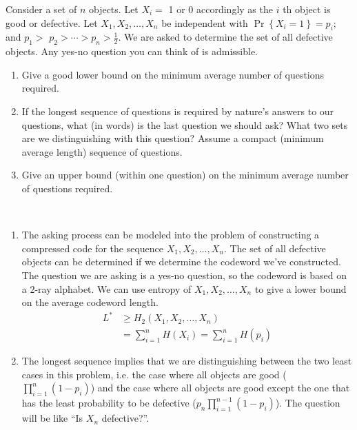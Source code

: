 \begin{exercise}{ Consider a set of $n$ objects. Let $X_{i}=$ 1 or 0 accordingly as the $i$ th object is good or defective. Let $X_{1}, X_{2}, \ldots, X_{n}$ be independent with $\operatorname{Pr}\left\{X_{i}=1\right\}=p_{i} ;$ and $p_{1}>$
  $p_{2}>\cdots>p_{n}>\frac{1}{2} .$ We are asked to determine the set of all defective objects. Any yes-no question you can think of is admissible.
  \begin{enumerate}
    \item Give a good lower bound on the minimum average number of questions required. 
    \item If the longest sequence of questions is required by nature's answers to our questions, what (in words) is the last question we should ask? What two sets are we distinguishing with this question? Assume a compact (minimum average length) sequence of questions.
    \item Give an upper bound (within one question) on the minimum average number of questions required.
  \end{enumerate}}
  \begin{solution}
  \par{~}
  \begin{enumerate}
    \item { 
      The asking process can be modeled into the problem of constructing a compressed code for the sequence $X_1,X_2,\ldots,X_n$. The set of all defective objects can be determined if we determine the codeword we've constructed. The question we are asking is a yes-no question, so the codeword is based on a 2-ray alphabet. We can use entropy of $X_1,X_2,\ldots,X_n$ to give a lower bound on the average codeword length.
      \begin{equation}
        \begin{aligned}
          L^* &\ge H_2 (X_1,X_2,\ldots,X_n) \\
          &= \sum_{i=1}^{n} H(X_i) = \sum_{i=1}^{n} H(p_i)
        \end{aligned}
      \end{equation} 
    }
    \item { The longest sequence implies that we are distinguishing between the two least cases in this problem, i.e. the case where all objects are good ($\prod_{i=1}^n(1-p_i)$) and the case where all objects are good except the one that has the least probability to be defective ($p_n \prod_{i=1}^{n-1}(1-p_i)$). The question will be like ``Is $X_n$ defective?''.
}
\end{enumerate}
\end{solution}
\end{exercise}
